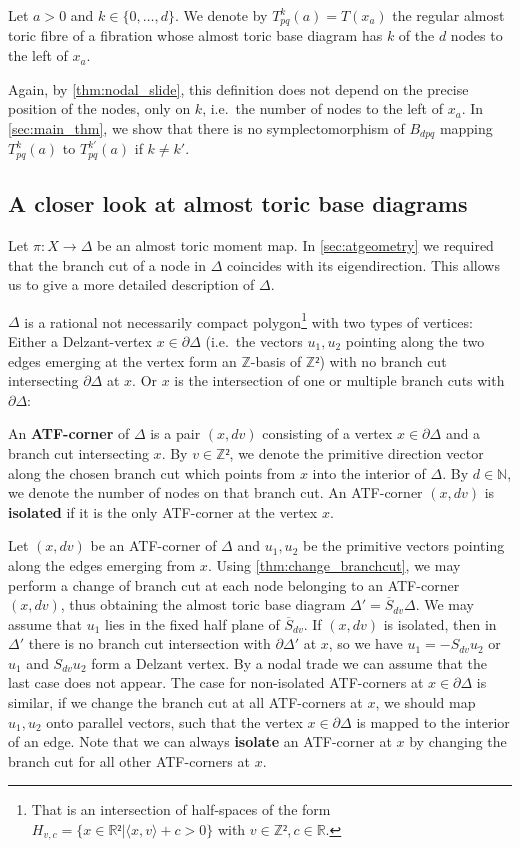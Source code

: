 \documentclass[12pt,a4paper,draft]{scrartcl}
\begin{document}
\begin{definition}
  \label{def:our_tori}
    Let $a>0$ and $k \in \{0,\ldots,d\}$.
We denote by $T^k_{pq}(a) = T(x_a)$ the regular almost toric fibre of a fibration whose almost toric base diagram has $k$ of the $d$ nodes to the left of $x_a$. 
\end{definition}

Again, by \cref{thm:nodal_slide}, this definition does not depend on the precise position of the nodes, only on $k$, i.e.\ the number of nodes to the left of $x_a$.
In \cref{sec:main_thm}, we show that there is no symplectomorphism of $B_{dpq}$ mapping $T^k_{pq}(a)$ to $T^{k'}_{pq}(a)$ if $k \neq k'$.


\subsection{A closer look at almost toric base diagrams}
\label{sec:atf_base_diagrams}

Let $π:X → Δ$ be an almost toric moment map. In \cref{sec:atgeometry} we required that the branch cut of a node in $Δ$ coincides with its eigendirection.
This allows us to give a more detailed description of $Δ$.

$Δ$ is a rational not necessarily compact polygon\footnote{That is an intersection of half-spaces of the form $H_{v,c} = \{x ∈ ℝ² | ⟨x,v⟩+c > 0\}$ with $v ∈ ℤ², c ∈ ℝ$.} with two types of vertices: Either a Delzant-vertex $x ∈ ∂Δ$ (i.e.\ the vectors $u_1,u_2$ pointing along the two edges emerging at the vertex form an $ℤ$-basis of $ℤ²$) with no branch cut intersecting $∂Δ$ at $x$.
Or $x$ is the intersection of one or multiple branch cuts with $∂Δ$:

\begin{definition}
  \label{def:atf_corner}
  An \textbf{ATF-corner} of $Δ$ is a pair $(x,dv)$ consisting of a vertex $x ∈ ∂Δ$ and a branch cut intersecting $x$.
  By $v ∈ ℤ²$, we denote the primitive direction vector along the chosen branch cut which points from $x$ into the interior of $\Delta$.
  By $d \in \mathbb{N}$, we denote the number of nodes on that branch cut.
An ATF-corner $(x,dv)$ is \textbf{isolated} if it is the only ATF-corner at the vertex $x$. 
\end{definition}

Let $(x,dv)$ be an ATF-corner of $Δ$ and $u_1,u_2$ be the primitive vectors pointing along the edges emerging from $x$.
Using \cref{thm:change_branchcut}, we may perform a change of branch cut at each node belonging to an ATF-corner $(x,dv)$, thus obtaining the almost toric base diagram $Δ' = \overline{S}_{dv}Δ$.
We may assume that $u_1$ lies in the fixed half plane of $\overline{S}_{dv}$.
If $(x,dv)$ is isolated, then in $Δ'$ there is no branch cut intersection with $∂Δ'$ at $x$, so we have $u_1 = -S_{dv}u_2$ or $u_1$ and $S_{dv}u_2$ form a Delzant vertex.
By a nodal trade we can assume that the last case does not appear.
The case for non-isolated ATF-corners at $x ∈ ∂Δ$ is similar, if we change the branch cut at all ATF-corners at $x$, we should map $u_1,u_2$ onto parallel vectors, such that the vertex $x ∈ ∂Δ$ is mapped to the interior of an edge.
Note that we can always \textbf{isolate} an ATF-corner at $x$ by changing the branch cut for all other ATF-corners at $x$.
\end{document}
